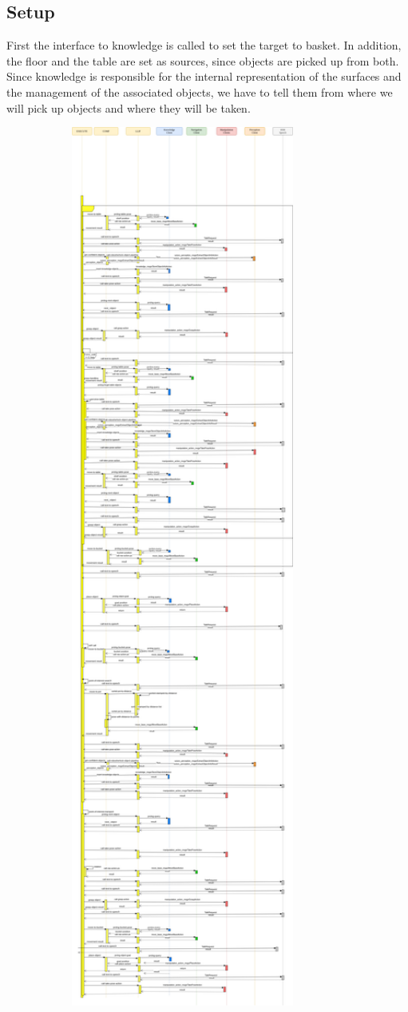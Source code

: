 \documentclass[main.tex]{subfiles}
\begin{document}
	  	\subsection{Setup}
	First the interface to knowledge is called to set the target to basket. In addition, the floor and the table are set as sources, since objects are picked up from both. Since knowledge is responsible for the internal representation of the surfaces and the management of the associated objects, we have to tell them from where we will pick up objects and where they will be taken. 
	  	\begin{figure}	
	  		\centering
	  		\includegraphics[width=0.85\textwidth]{pictures/diagramms/cleanup-sequence.png}

\end{figure}
\end{document}
